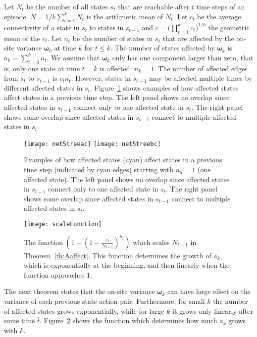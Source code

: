 \documentclass{article}
\newcommand\Bom{\bm{\omega}}
\renewcommand{\leq}{\leqslant}
\begin{document}
\begin{appendices}
Let $N_t$ be the number of all states $s_t$ that are reachable after $t$ time steps
of an episode.
$\bar{N}=1/k \sum_{t=1}^k N_{t}$ is the arithmetic mean of $N_t$.
Let $c_t$ be the
average connectivity of a state in $s_t$ to states in $s_{t-1}$ and
$\bar{c}= \big(\prod_{t=1}^k c_t\big)^{1/k}$ the geometric mean of
the $c_t$.
Let $n_t$ be the number of states in $s_t$ that are affected by the
on-site variance $\Bom_k$ at time $k$ 
for $t \leq k$.
The number of states affected by $\Bom_k$ is $a_k=\sum_{t=0}^k n_t$.
We assume that $\Bom_k$ only has one component larger than zero, that
is, only one state at time $t=k$ is affected: $n_k=1$.
The number of affected edges from $s_t$ to $s_{t-1}$ is $c_t n_t$.
However, states in $s_{t-1}$ may be affected multiple times by different
affected states in $s_t$.
Figure~\ref{fig:affectedStates} shows examples of how affected states affect states in a
previous time step. The left panel shows no overlap
since affected states in $s_{t-1}$ connect only to
one affected state in $s_t$. The right panel shows some overlap
since affected states in $s_{t-1}$ connect to multiple
affected states in $s_t$.

\begin{figure}[htp]
\centering
\texttt{[image: net5treeac]}
\texttt{[image: net5treebc]}
\caption{Examples of how affected states (cyan) affect states in a
  previous time step (indicated by cyan edges) starting with $n_5=1$
  (one affected state).  The left panel shows no overlap
  since affected states in $s_{t-1}$ connect only to
  one affected state in $s_t$. The right panel shows some overlap
  since affected states in $s_{t-1}$ connect to multiple
  affected states in $s_t$.
\label{fig:affectedStates}}
\end{figure}


\begin{figure}[htb]
\centering
\texttt{[image: scaleFunction]}
\caption{The function $\left( 1 -   \left( 1 -
      \frac{c_t}{N_{t-1}} \right)^{n_t} \right)$ which scales $N_{t-1}$ in
    Theorem~\ref {th:Aaffect}. This function determines the growth of
    $a_k$, which is exponentially at the beginning, and then linearly
    when the function approaches 1.
\label{fig:growth}}
\end{figure}



The next theorem states that the on-site
variance $\Bom_k$ can have large effect on the variance of
each previous state-action pair. 
Furthermore, for small $k$ the number of affected
states grows exponentially, while for large $k$ it grows only 
linearly after some time $\hat{t}$. Figure~\ref{fig:growth} shows the
function which determines how much $a_k$ grows with $k$. 


\end{appendices}
\end{document}
